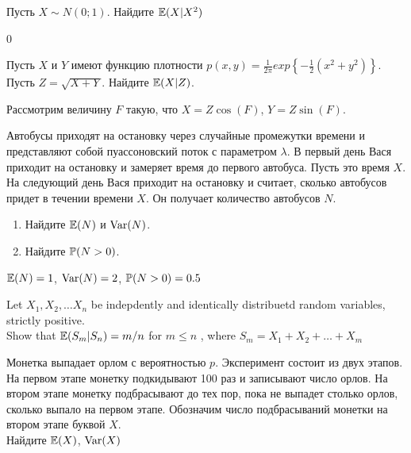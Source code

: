 \begin{problem}
Пусть $X\sim N(0;1)$. Найдите $\E(X|X^{2})$

\begin{sol}
0
\end{sol}
\end{problem}

\begin{problem}
Пусть $X$ и $Y$ имеют функцию плотности
$p(x,y)=\frac{1}{2\pi}exp\left\{-\frac{1}{2}\left(x^{2}+y^{2}\right)\right\}$.\\
Пусть $Z=\sqrt{X+Y}$. Найдите $\E(X|Z)$.

\begin{sol}

Рассмотрим величину $F$ такую, что $X=Z\cos(F)$, $Y=Z\sin(F)$.
\end{sol}
\end{problem}

\begin{problem}
Автобусы приходят на остановку через случайные промежутки времени и представляют собой пуассоновский поток с параметром $\lambda$. В первый день Вася приходит на остановку и замеряет время до первого автобуса. Пусть это время $X$. На следующий день Вася приходит на остановку и считает, сколько автобусов придет в течении времени $X$. Он получает количество автобусов $N$.
\begin{enumerate}
\item Найдите $\E(N)$ и $\Var(N)$.
\item Найдите $\P(N>0)$.
\end{enumerate}


\begin{sol}
$\E(N)=1$, $\Var(N)=2$, $\P(N>0)=0.5$
\end{sol}
\end{problem}

\begin{problem}
Let $X_1, X_2, \ldots X_n$ be indepdently and identically distribuetd random variables, strictly positive. \\
Show that $\E(S_{m}|S_{n})= m/n$ for $m\le n$ , where $S_{m} = X_{1} + X_{2} + \ldots + X_{m}$

\begin{sol}

\end{sol}
\end{problem}

\begin{problem}
Монетка выпадает орлом с вероятностью $p$. Эксперимент состоит из двух этапов. На первом этапе монетку подкидывают 100 раз и записывают число орлов. На втором этапе монетку подбрасывают до тех пор, пока не выпадет столько орлов, сколько выпало на первом этапе. Обозначим число подбрасываний монетки на втором этапе буквой $X$. \\
Найдите $\E(X)$, $\Var(X)$

\begin{sol}

\end{sol}
\end{problem}

